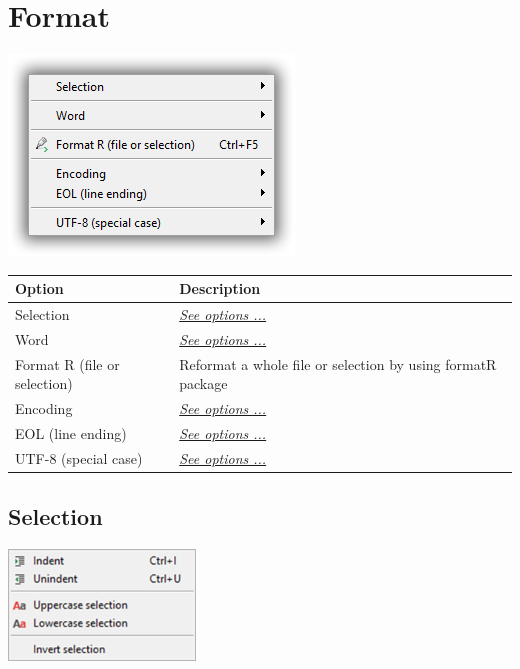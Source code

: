 
\hypertarget{menu_format}{}
\section{Format}

\includegraphics[scale=0.50]{./res/menu_format.png}\\

\begin{scriptsize}
  \begin{tabularx}{\textwidth}{>{\hsize=0.3\hsize}X>{\hsize=0.7\hsize}X}\\
    \hline
    \textbf{Option} & \textbf{Description} \\
    \hline
    Selection & \textit{\href{\#menu\_format\_selection}{See options ...}} \\
    Word & \textit{\href{\#menu\_format\_word}{See options ...}} \\
    Format R (file or selection) & Reformat a whole file or selection by using formatR package \\
    Encoding & \textit{\href{\#menu\_format\_encoding}{See options ...}} \\
    EOL (line ending) & \textit{\href{\#menu\_format\_eol}{See options ...}} \\
    UTF-8 (special case) & \textit{\href{\#menu\_format\_utf8}{See options ...}} \\
    \hline
  \end{tabularx}
\end{scriptsize}


\hypertarget{menu_format_selection}{}
\subsection{Selection}

\includegraphics[scale=0.50]{./res/menu_format_selection.png}\\


